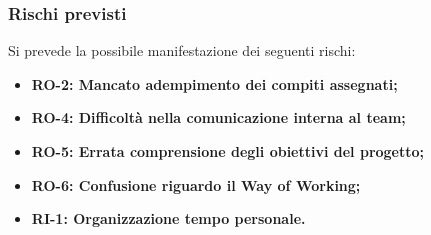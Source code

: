 \documentclass[a4paper,12pt]{article}
\begin{document}
        \subsubsection{Rischi previsti}{
            Si prevede la possibile manifestazione dei seguenti rischi:
            \begin{itemize}
                \item \textbf{RO-2: Mancato adempimento dei compiti assegnati;}
                \item \textbf{RO-4: Difficoltà nella comunicazione interna al team;}
                \item \textbf{RO-5: Errata comprensione degli obiettivi del progetto;}
                \item \textbf{RO-6: Confusione riguardo il Way of Working;}
                \item \textbf{RI-1: Organizzazione tempo personale.}
            \end{itemize}
        }
    
\end{document}
